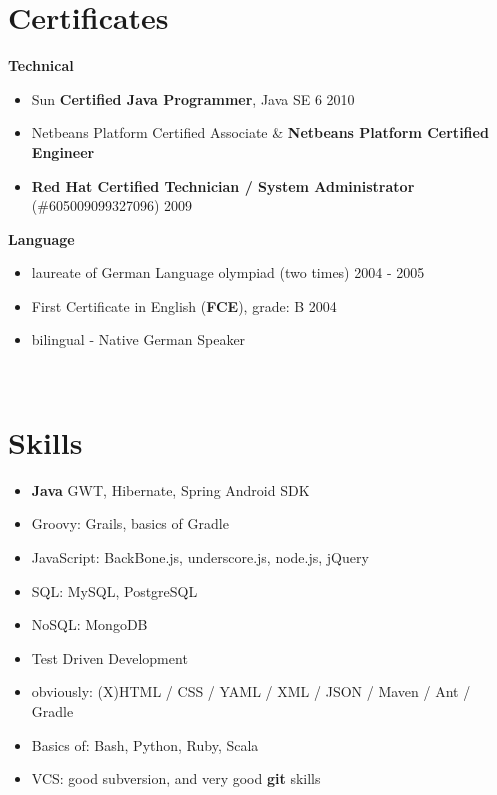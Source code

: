 \documentclass{res}
\begin{document}
\begin{resume}
\section{Certificates} 
{\bf Technical}
\begin{itemize}
 \item Sun \textbf{Certified Java Programmer}, Java SE 6 \hfill 2010
 \item Netbeans Platform Certified Associate \& \textbf{Netbeans Platform Certified Engineer}
 \item \textbf{ Red Hat Certified Technician / System
Administrator} (\#605009099327096) \hfill 2009\\
\end{itemize}
{\bf Language}
\begin{itemize}
 \item laureate of German Language olympiad (two times) \hfill 2004 - 2005
 \item First Certificate in English (\textbf{FCE}), grade: B \hfill 2004
 \item bilingual - Native German Speaker
\end{itemize}

\\
\section{Skills}
\begin{itemize}
 \item \textbf{Java}
 \subitem GWT, Hibernate, Spring
 \subitem Android SDK
 \item Groovy: Grails, basics of Gradle
 \item JavaScript: BackBone.js, underscore.js, node.js, jQuery
 \item SQL: MySQL, PostgreSQL
 \item NoSQL: MongoDB 
 \item Test Driven Development
 \item obviously: (X)HTML / CSS / YAML / XML / JSON / Maven / Ant / Gradle
 \item Basics of: Bash, Python, Ruby, Scala
 \item VCS: good subversion, and very good \textbf{git} skills
\end{itemize}


\end{resume}
\end{document}
